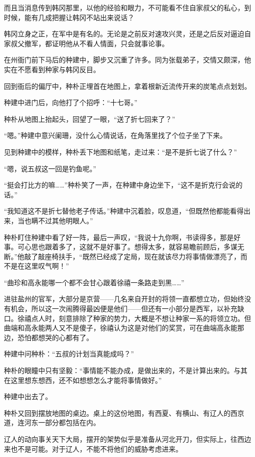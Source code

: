 而且当消息传到韩冈那里，以他的经验和眼力，不可能看不住自家叔父的私心，到时候，能有几成把握让韩冈不站出来说话？

韩冈立身之正，在军中是有名的。无论是之前反对速攻兴灵，还是之后反对逼迫自家叔父撤军，都证明他从不看人情面，只会就事论事。

在州衙门前下马后的种建中，脚步又沉重了许多。同为张载弟子，交情又颇深，他实在不愿看到种家与韩冈反目。

回到衙后的偏厅中，种朴正埋首在地图上，拿着根新近流传开来的炭笔点点划划。

种建中进门后，向他打了个招呼：“十七哥。”

种朴从地图上抬起头，回望了一眼，“送了折七回来了？”

“嗯。”种建中意兴阑珊，没什么心情说话，在角落里找了个位子坐了下来。

见到种建中的模样，种朴丢下地图和纸笔，走过来：“是不是折七说了什么？”

“嗯，说五叔这一回是钓鱼呢。”

“挺会打比方的嘛……”种朴笑了一声，在种建中身边坐下，“这不是折克行会说的话。”

“我知道这不是折七替他老子传话。”种建中沉着脸，叹息道，“但既然他都能看得出来，当也瞒不过其他明眼人。”

种朴盯住种建中看了好一阵，最后一声叹，“我说十九你啊，书读得多，那是好事。可心思也跟着多了，这就不是好事了。想得太多，就容易瞻前顾后，多谋无断。”他敲了敲座椅扶手，“既然已经成了定局，现在就该尽力将事情做漂亮了，而不是在这里叹气啊！”

“曲珍和高永能哪一个都不会甘心跟着徐禧一条路走到黑……”

进驻盐州的官军，大部分是京营——几名来自开封的将领一直都想立功，但始终没有机会，所以这一次闹腾得最凶便是他们——但还有一小部分是西军，以补充缺口。徐禧点人时，刻意排除了种家的势力，大概是不想让种家一系的将领立功。但曲端和高永能两人又不是傻子，徐禧认为这是对他们的奖赏，可在曲端高永能那边，恐怕都想哭的心都有了。

种建中问种朴：“五叔的计划当真能成吗？”

种朴的眼瞳中只有坚毅：“事情能不能办成，是做出来的，不是计算出来的。与其在这里想东想西，还不如想想怎么才能将事情做好。”

种建中出去了。

种朴又回到摆放地图的桌边。桌上的这份地图，有西夏、有横山、有辽人的西京道，连河东一部分都包括在内。

辽人的动向事关天下大局，摆开的架势似乎是准备从河北开刀，但实际上，往西边来也不是可能。对于辽人，不能不将他们的威胁考虑进来。

